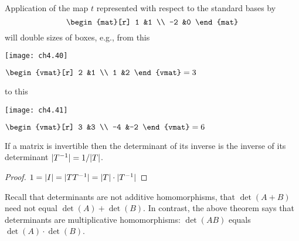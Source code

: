 \begin{example}
Application of the map $t$ represented with respect to the standard  
bases by
\begin{equation*}
  \begin{mat}[r]
    1  &1  \\
   -2  &0
  \end{mat}
\end{equation*}
will double sizes of boxes, e.g., from this
\begin{center}
    \parbox{1.5in}{\hbox{}\hfil\texttt{[image: ch4.40]}\hfil\hbox{}}  
    \quad
    $\begin{vmat}[r]
      2  &1  \\
      1  &2
    \end{vmat}=3$
\end{center}
to this
\begin{center}
    \parbox{1.5in}{\hbox{}\hfil\texttt{[image: ch4.41]}\hfil\hbox{}}  
    \quad
    $\begin{vmat}[r]
        3  &3  \\
       -4  &-2
     \end{vmat}=6$
\end{center}
\end{example}


\begin{corollary}
If a matrix is invertible then the determinant of its inverse is the
inverse of its determinant $\deter{T^{-1}}=1/\deter{T}$.
\end{corollary}

\begin{proof}
$1=\deter{I}=\deter{TT^{-1}}=\deter{T}\cdot\deter{T^{-1}}$  
\end{proof}

Recall that determinants are not additive homomorphisms, that
$\det(A+B)$ need not equal $\det(A)+\det(B)$.
In contrast, the above theorem says that determinants are
multiplicative homomorphisms:
$\det(AB)$ equals $\det(A)\cdot \det(B)$.


